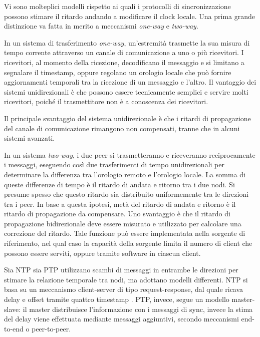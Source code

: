 Vi sono molteplici modelli rispetto ai quali i protocolli di sincronizzazione possono
stimare il ritardo andando a modificare il clock locale. Una prima grande
distinzione va fatta in merito a meccanismi \textit{one-way} e \textit{two-way}.

In un sistema di trasferimento \textit{one-way}, un'estremità trasmette la sua
misura di tempo corrente attraverso un canale di comunicazione a uno o più
ricevitori. I ricevitori, al momento della ricezione, decodificano il messaggio e
si limitano a segnalare il timestamp, oppure regolano un orologio locale che può
fornire aggiornamenti temporali tra la ricezione di un messaggio e l'altro. Il vantaggio
dei sistemi unidirezionali è che possono essere tecnicamente semplici e servire molti
ricevitori, poiché il trasmettitore non è a conoscenza dei ricevitori.

Il principale svantaggio del sistema unidirezionale è che i ritardi di
propagazione del canale di comunicazione rimangono non compensati, tranne che in alcuni
sistemi avanzati.

In un sistema \textit{two-way}, i due peer si trasmetteranno e riceveranno reciprocamente
i messaggi, eseguendo così due trasferimenti di tempo unidirezionali per
determinare la differenza tra l'orologio remoto e l'orologio locale. La somma di queste
differenze di tempo è il ritardo di andata e ritorno tra i due nodi. Si presume
spesso che questo ritardo sia distribuito uniformemente tra le direzioni tra i
peer. In base a questa ipotesi, metà del ritardo di andata e ritorno è il
ritardo di propagazione da compensare. Uno svantaggio è che il ritardo di propagazione
bidirezionale deve essere misurato e utilizzato per calcolare una correzione del ritardo.
Tale funzione può essere implementata nella sorgente di riferimento, nel qual caso
la capacità della sorgente limita il numero di client che possono essere serviti,
oppure tramite software in ciascun client. \cite{TimeFrequencyTransfer2025}

Sia NTP sia PTP utilizzano scambi di messaggi in entrambe le direzioni per
stimare la relazione temporale tra nodi, ma adottano modelli differenti. NTP si
basa su un meccanismo client-server di tipo request-response, dal quale ricava delay
e offset tramite quattro timestamp \cite{martinNetworkTimeProtocol2010}. PTP, invece,
segue un modello master-slave: il master distribuisce l'informazione con i messaggi di sync, invece la stima del delay viene effettuata
mediante messaggi aggiuntivi, secondo meccanismi end-to-end o peer-to-peer.
\cite{IEEEStandardPrecision2020}

